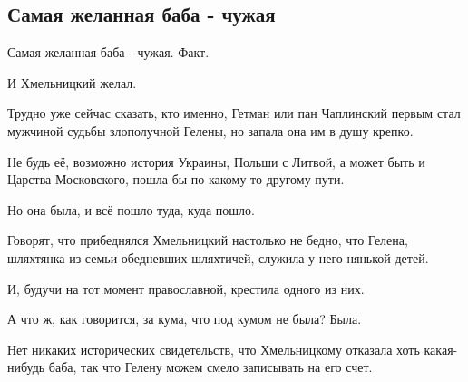  
 
 

\subsection{Самая желанная баба - чужая}
\label{sec:30_10_2020.fb.max_buzhanskii.2.hmel_zhena}


Самая желанная баба - чужая.
Факт.

И Хмельницкий желал.

Трудно уже сейчас сказать, кто именно, Гетман или пан Чаплинский первым стал
мужчиной судьбы злополучной Гелены, но запала она им в душу крепко.

Не будь её, возможно история Украины, Польши с Литвой, а может быть и Царства
Московского, пошла бы по какому то другому пути.

Но она была, и всё пошло туда, куда пошло.

Говорят, что прибеднялся Хмельницкий настолько не бедно, что Гелена, шляхтянка
из семьи обедневших шляхтичей, служила у него нянькой детей.

И, будучи на тот момент православной, крестила одного из них.

А что ж, как говорится, за кума, что под кумом не была?
Была.

Нет никаких исторических свидетельств, что Хмельницкому отказала хоть
какая-нибудь баба, так что Гелену можем смело записывать на его счет.

